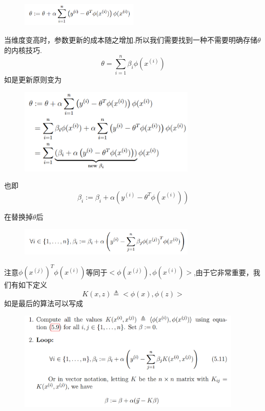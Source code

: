 \documentclass[12pt, a4paper, oneside]{ctexbook}
\begin{document}
  \begin{figure}[h]
		\centering 
		\includegraphics[width=0.5\textwidth]{images53.png} 
	\end{figure}

当维度变高时，参数更新的成本随之增加.所以我们需要找到一种不需要明确存储$\theta$的内核技巧.\[\theta=\sum_{i=1}^{n}\beta_i \phi(x^{(i)})\]如是更新原则变为

  \begin{figure}[h]
		\centering 
		\includegraphics[width=0.75\textwidth]{images54.png} 
	\end{figure}

也即\[\beta_i:=\beta_i+\alpha(y^{(i)}-\theta^{T}\phi(x^{(i)}))\]

在替换掉$\theta$后

  \begin{figure}[h]
		\centering 
		\includegraphics[width=0.75\textwidth]{images55.png} 
	\end{figure}

注意$\phi(x^{(j)})^{T}\phi(x^{(i)})$等同于$<\phi(x^{(j)}),\phi(x^{(i)})>$,由于它非常重要，我们有如下定义\[K(x,z)\triangleq <\phi(x),\phi(z)>\]如是最后的算法可以写成

  \begin{figure}[h]
		\centering 
		\includegraphics[width=0.95\textwidth]{images57.png} 
	\end{figure}
\end{document}
